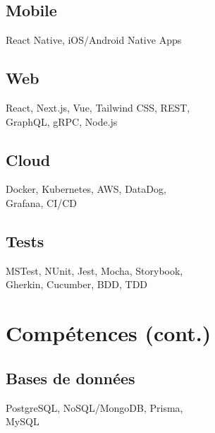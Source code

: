 \documentclass{article}
\begin{document}
\begin{paracol}{2}
\begin{leftcolumn}
    \subsection{Mobile}
    React Native, iOS/Android Native Apps

    \vspace{0.5em}

    \subsection{Web}
    React, Next.js, Vue, Tailwind CSS, REST, \\
    GraphQL, gRPC, Node.js

    \vspace{0.5em}

    \subsection{Cloud}
    Docker, Kubernetes, AWS, DataDog,\\
    Grafana, CI/CD

    \vspace{0.5em}

    \subsection{Tests}
    MSTest, NUnit, Jest, Mocha, Storybook, \\
    Gherkin, Cucumber, BDD, TDD

    \pagebreak
    \section{Compétences (cont.)}

    \subsection{Bases de données}
    PostgreSQL, NoSQL/MongoDB, Prisma, \\
    MySQL


\end{leftcolumn}
\end{paracol}
\end{document}
